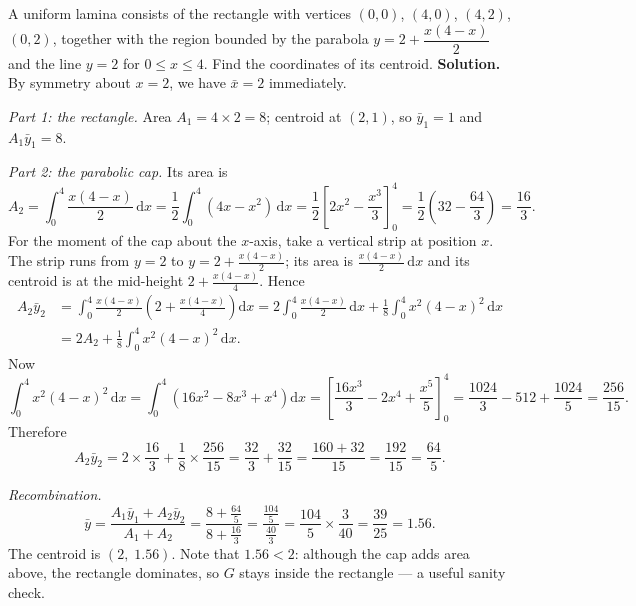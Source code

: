 \documentclass[11pt]{article}
\begin{document}
\begin{exoresolu}
A uniform lamina consists of the rectangle with vertices $(0,0)$, $(4,0)$, $(4,2)$, $(0,2)$, together with the region bounded by the parabola $y=2+\dfrac{x(4-x)}{2}$ and the line $y=2$ for $0\le x\le 4$. Find the coordinates of its centroid.
\tcblower
\textbf{Solution.} By symmetry about $x=2$, we have $\bar{x}=2$ immediately.

\emph{Part 1: the rectangle.} Area $A_1=4\times 2=8$; centroid at $(2,1)$, so $\bar{y}_1=1$ and $A_1\bar{y}_1=8$.

\emph{Part 2: the parabolic cap.} Its area is
\[
A_2=\int_0^4 \frac{x(4-x)}{2}\,\mathrm{d}x
=\frac{1}{2}\int_0^4(4x-x^2)\,\mathrm{d}x
=\frac{1}{2}\left[2x^2-\frac{x^3}{3}\right]_0^4
=\frac{1}{2}\left(32-\frac{64}{3}\right)=\frac{16}{3}.
\]
For the moment of the cap about the $x$-axis, take a vertical strip at position $x$. The strip runs from $y=2$ to $y=2+\tfrac{x(4-x)}{2}$; its area is $\tfrac{x(4-x)}{2}\,\mathrm{d}x$ and its centroid is at the mid-height $2+\tfrac{x(4-x)}{4}$. Hence
\begin{align*}
A_2\bar{y}_2&=\int_0^4 \frac{x(4-x)}{2}\left(2+\frac{x(4-x)}{4}\right)\mathrm{d}x
=2\int_0^4\frac{x(4-x)}{2}\,\mathrm{d}x+\frac{1}{8}\int_0^4 x^2(4-x)^2\,\mathrm{d}x\\
&=2A_2+\frac{1}{8}\int_0^4 x^2(4-x)^2\,\mathrm{d}x.
\end{align*}
Now
\[
\int_0^4 x^2(4-x)^2\,\mathrm{d}x=\int_0^4\left(16x^2-8x^3+x^4\right)\mathrm{d}x
=\left[\frac{16x^3}{3}-2x^4+\frac{x^5}{5}\right]_0^4
=\frac{1024}{3}-512+\frac{1024}{5}=\frac{256}{15}.
\]
Therefore
\[
A_2\bar{y}_2=2\times\frac{16}{3}+\frac{1}{8}\times\frac{256}{15}
=\frac{32}{3}+\frac{32}{15}=\frac{160+32}{15}=\frac{192}{15}=\frac{64}{5}.
\]

\emph{Recombination.}
\[
\bar{y}=\frac{A_1\bar{y}_1+A_2\bar{y}_2}{A_1+A_2}
=\frac{8+\tfrac{64}{5}}{8+\tfrac{16}{3}}
=\frac{\tfrac{104}{5}}{\tfrac{40}{3}}
=\frac{104}{5}\times\frac{3}{40}=\frac{39}{25}=1.56.
\]
The centroid is $\left(2,\;1.56\right)$. Note that $1.56<2$: although the cap adds area above, the rectangle dominates, so $G$ stays inside the rectangle --- a useful sanity check.
\end{exoresolu}
\end{document}

